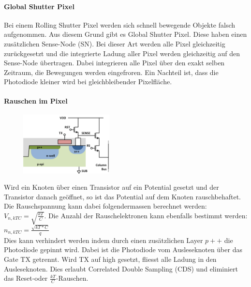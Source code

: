 \paragraph{Global Shutter Pixel}
Bei einem Rolling Shutter Pixel werden sich schnell bewegende Objekte falsch aufgenommen. Aus diesem Grund gibt es Global Shutter Pixel. Diese haben einen zusätzlichen Sense-Node (SN). Bei dieser Art werden alle Pixel gleichzeitig zurückgesetzt und die integrierte Ladung aller Pixel werden gleichzeitig auf den Sense-Node übertragen. Dabei integrieren alle Pixel über den exakt selben Zeitraum, die Bewegungen werden eingefroren. Ein Nachteil ist, dass die Photodiode kleiner wird bei gleichbleibender Pixelfläche.

\newpage
\paragraph{Rauschen im Pixel}
\begin{figure}
    \centering
    \includegraphics[width=0.42\textwidth]{images/cmos_aps_pinned}
\end{figure}
Wird ein Knoten über einen Transistor auf ein Potential gesetzt und der Transistor danach geöffnet, so ist das Potential auf dem Knoten rauschbehaftet. Die Rauschspannung kann dabei folgendermassen berechnet werden: $V_{n, kTC} = \sqrt{\frac{kT}{C}}$. Die Anzahl der Rauschelektronen kann ebenfalls bestimmt werden: $n_{n, kTC} = \frac{\sqrt{kT*C}}{q}$ \\
Dies kann verhindert werden indem durch einen zusätzlichen Layer $p++$ die Photodiode gepinnt wird. Dabei ist die Photodiode vom Ausleseknoten über das Gate TX getrennt. Wird TX auf high gesetzt, fliesst alle Ladung in den Ausleseknoten. Dies erlaubt Correlated Double Sampling (CDS) und eliminiert das Reset-oder $\frac{kT}{C}$-Rauschen.
\\
